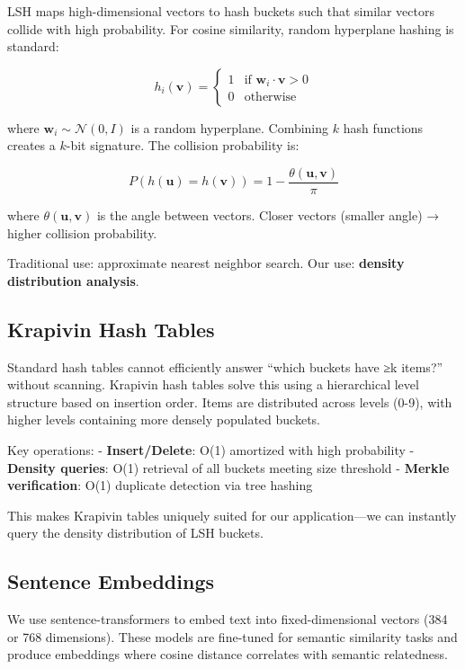 \documentclass[
]{article}
\begin{document}
LSH \autocite{indyk1998approximate} maps high-dimensional vectors to
hash buckets such that similar vectors collide with high probability.
For cosine similarity, random hyperplane hashing
\autocite{charikar2002simhash} is standard:

\[h_i(\mathbf{v}) = \begin{cases} 1 & \text{if } \mathbf{w}_i \cdot \mathbf{v} > 0 \\ 0 & \text{otherwise} \end{cases}\]

where \(\mathbf{w}_i \sim \mathcal{N}(0, I)\) is a random hyperplane.
Combining \(k\) hash functions creates a \(k\)-bit signature. The
collision probability is:

\[P(h(\mathbf{u}) = h(\mathbf{v})) = 1 - \frac{\theta(\mathbf{u}, \mathbf{v})}{\pi}\]

where \(\theta(\mathbf{u}, \mathbf{v})\) is the angle between vectors.
Closer vectors (smaller angle) → higher collision probability.

Traditional use: approximate nearest neighbor search. Our use:
\textbf{density distribution analysis}.

\subsection{Krapivin Hash Tables}\label{krapivin-hash-tables}

Standard hash tables cannot efficiently answer ``which buckets have ≥k
items?'' without scanning. Krapivin hash tables
\autocite{krapivin2025optimal} solve this using a hierarchical level
structure based on insertion order. Items are distributed across levels
(0-9), with higher levels containing more densely populated buckets.

Key operations: - \textbf{Insert/Delete}: O(1) amortized with high
probability - \textbf{Density queries}: O(1) retrieval of all buckets
meeting size threshold - \textbf{Merkle verification}: O(1) duplicate
detection via tree hashing

This makes Krapivin tables uniquely suited for our application---we can
instantly query the density distribution of LSH buckets.

\subsection{Sentence Embeddings}\label{sentence-embeddings}

We use sentence-transformers \autocite{reimers2019sentence} to embed
text into fixed-dimensional vectors (384 or 768 dimensions). These
models are fine-tuned for semantic similarity tasks and produce
embeddings where cosine distance correlates with semantic relatedness.
\end{document}
